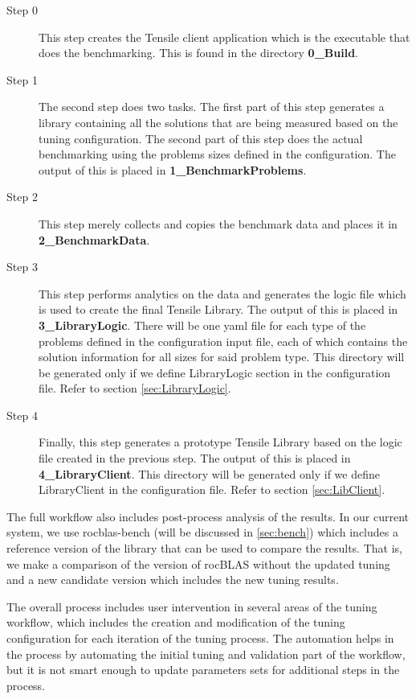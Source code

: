 \documentclass[]{article}
\begin{document}
\begin{description}
	\item[Step 0] This step creates the Tensile client application which is the executable that does the benchmarking. This is found in the directory \textbf{0\_Build}.
	\item[Step 1] The second step does two tasks. The first part of this step generates a library containing all the solutions that are being measured based on the tuning configuration. The second part of this step does the actual benchmarking using the problems sizes defined in the configuration. The output of this is placed in \textbf{1\_BenchmarkProblems}.
	\item[Step 2] This step merely collects and copies the benchmark data and places it in \textbf{2\_BenchmarkData}.
	\item[Step 3] This step performs analytics on the data and generates the logic file which is used to create the final Tensile Library. The output of this is placed in \textbf{3\_LibraryLogic}. There will be one yaml file for each type of the problems defined in the configuration input file, each of which contains the solution information for all sizes for said problem type. This directory will be generated only if we define LibraryLogic section in the configuration file. Refer to section \ref{sec:LibraryLogic}.
	\item[Step 4] Finally, this step generates a prototype Tensile Library based on the logic file created in the previous step. The output of this is placed in \textbf{4\_LibraryClient}. This directory will be generated only if we define LibraryClient in the configuration file. Refer to section \ref{sec:LibClient}.

\end{description}

The full workflow also includes post-process analysis of the results. In our current system, we use rocblas-bench (will be discussed in \ref{sec:bench}) which includes a reference version of the library that can be used to compare the results. That is, we make a comparison of the version of rocBLAS without the updated tuning and a new candidate version which includes the new tuning results.

The overall process includes user intervention in several areas of the tuning workflow, which includes the creation and modification of the tuning configuration for each iteration of the tuning process. The automation helps in the process by automating the initial tuning and validation part of the workflow, but it is not smart enough to update parameters sets for additional steps in the process.
\end{document}
